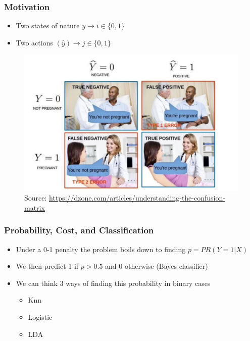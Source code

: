 \documentclass[
  shownotes,
  xcolor={svgnames},
  hyperref={colorlinks,citecolor=DarkBlue,linkcolor=DarkRed,urlcolor=DarkBlue}
  , aspectratio=169]{beamer}
\begin{document}
\begin{frame}[fragile]
\frametitle{Motivation}

\begin{itemize}
  \item Two states of nature $y \rightarrow i\in\{0,1\}$
  \medskip
  \item Two actions $(\hat{y}) \rightarrow j\in \{0,1\}$
\end{itemize}



        \begin{figure}[H] \centering
            \captionsetup{justification=centering}
              \includegraphics[scale=0.4]{figures/confusion_matrix}
              \\
              \tiny
              Source: \url{https://dzone.com/articles/understanding-the-confusion-matrix}
 \end{figure}

\end{frame}
\begin{frame}[fragile]
\frametitle{Probability, Cost, and Classification}

\begin{itemize}
  \item Under a 0-1 penalty the problem boils down to finding $p=PR(Y=1|X)$
  \medskip
  \item We then predict 1 if $p>0.5$ and 0 otherwise (Bayes classifier)
  \medskip
  \item We can think 3 ways of finding this probability in binary cases
  \begin{itemize}
    \item Knn
    \item Logistic
    \item LDA
  \end{itemize}
\end{itemize}


\end{frame}
\end{document}
